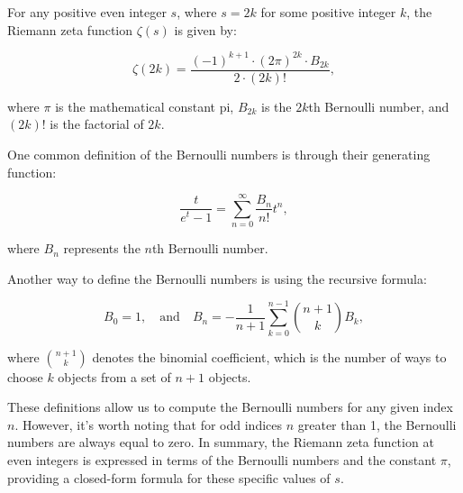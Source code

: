 {\begin{itemize}
		For any positive even integer \(s\), where \(s = 2k\) for some positive integer \(k\), the Riemann zeta function \(\zeta(s)\) is given by:

		\[\zeta(2k) = \frac{(-1)^{k+1} \cdot (2\pi)^{2k} \cdot B_{2k}}{2 \cdot (2k)!},\]

		where \(\pi\) is the mathematical constant pi, \(B_{2k}\) is the \(2k\)th Bernoulli number, and \((2k)!\) is the factorial of \(2k\).

		One common definition of the Bernoulli numbers is through their generating function:

		\[
		\frac{t}{e^t - 1} = \sum_{n=0}^{\infty} \frac{B_n}{n!} t^n,
		\]

		where \(B_n\) represents the \(n\)th Bernoulli number.

		Another way to define the Bernoulli numbers is using the recursive formula:

		\[
		B_0 = 1, \quad \text{and} \quad B_n = -\frac{1}{n+1} \sum_{k=0}^{n-1} \binom{n+1}{k} B_k,
		\]

		where \(\binom{n+1}{k}\) denotes the binomial coefficient, which is the number of ways to choose \(k\) objects from a set of \(n+1\) objects.

		These definitions allow us to compute the Bernoulli numbers for any given index \(n\). However, it's worth noting that for odd indices \(n\) greater than 1, the Bernoulli numbers are always equal to zero.			
		In summary, the Riemann zeta function at even integers is expressed in terms of the Bernoulli numbers and the constant \(\pi\), providing a closed-form formula for these specific values of \(s\).
	\end{itemize}
}